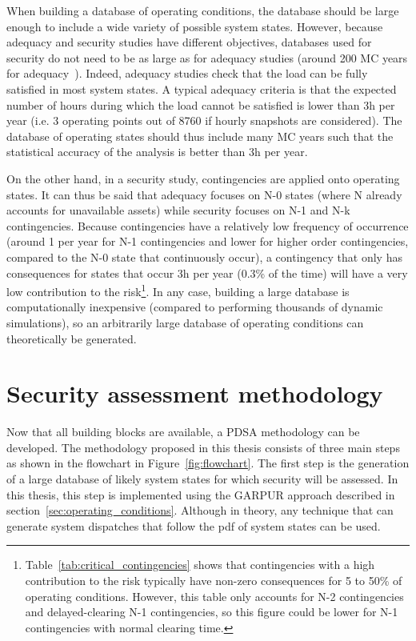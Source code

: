 When building a database of operating conditions, the database should be large enough to include a wide variety of possible system states. However, because adequacy and security studies have different objectives, databases used for security do not need to be as large as for adequacy studies (around 200 MC years for adequacy~\cite{EliaAdequacy}). Indeed, adequacy studies check that the load can be fully satisfied in most system states. A typical adequacy criteria is that the expected number of hours during which the load cannot be satisfied is lower than 3h per year (i.e. 3 operating points out of 8760 if hourly snapshots are considered). The database of operating states should thus include many MC years such that the statistical accuracy of the analysis is better than 3h per year.

On the other hand, in a security study, contingencies are applied onto operating states. It can thus be said that adequacy focuses on N-0 states (where N already accounts for unavailable assets) while security focuses on N-1 and N-k contingencies. Because contingencies have a relatively low frequency of occurrence (around 1 per year for N-1 contingencies and lower for higher order contingencies, compared to the N-0 state that continuously occur), a contingency that only has consequences for states that occur 3h per year (0.3\% of the time) will have a very low contribution to the risk\footnote{Table~\ref{tab:critical_contingencies} shows that contingencies with a high contribution to the risk typically have non-zero consequences for 5 to 50\% of operating conditions. However, this table only accounts for N-2 contingencies and delayed-clearing N-1 contingencies, so this figure could be lower for N-1 contingencies with normal clearing time.}. In any case, building a large database is computationally inexpensive (compared to performing thousands of dynamic simulations), so an arbitrarily large database of operating conditions can theoretically be generated.


\section{Security assessment methodology}
\label{sec:PDSA_methodology}

Now that all building blocks are available, a PDSA methodology can be developed. The methodology proposed in this thesis consists of three main steps as shown in the flowchart in Figure~\ref{fig:flowchart}. The first step is the generation of a large database of likely system states for which security will be assessed. In this thesis, this step is implemented using the GARPUR approach described in section~\ref{sec:operating_conditions}. Although in theory, any technique that can generate system dispatches that follow the pdf of system states can be used.



